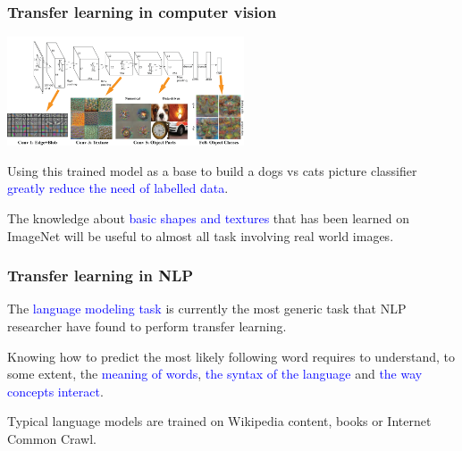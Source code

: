 \documentclass[10pt]{beamer}
\begin{document}
\begin{frame}

  \frametitle{Transfer learning in computer vision}

  \begin{center}
    \includegraphics[width = 7cm]{images/alexnet_architecture.png}
  \end{center}

  Using this trained model as a base to build a dogs vs cats picture
  classifier \textcolor{blue}{greatly reduce the need of labelled
    data}.

  \bigskip

  The knowledge about \textcolor{blue}{basic shapes and textures} that
  has been learned on ImageNet will be useful to almost all task
  involving real world images.

\end{frame}

\begin{frame}

  \frametitle{Transfer learning in NLP}

  \begin{center}
    \scalebox{0.7}{
      
    }
  \end{center}

  The \textcolor{blue}{language modeling task} is currently the most
  generic task that NLP researcher have found to perform transfer
  learning.

  \bigskip

  Knowing how to predict the most likely following word requires to
  understand, to some extent, the \textcolor{blue}{meaning of words},
  \textcolor{blue}{the syntax of the language} and
  \textcolor{blue}{the way concepts interact}.

  \bigskip

  Typical language models are trained on Wikipedia content, books or
  Internet Common Crawl.

\end{frame}
\end{document}
